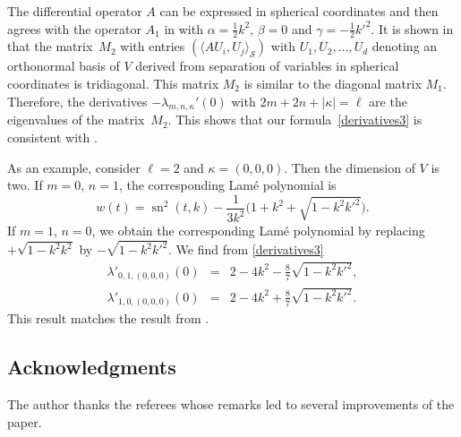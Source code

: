 \documentclass[pdftex]{sigma}
\newcommand{\Sp}{\mathcal{S}}
\DeclareMathOperator{\sn}{sn}
\numberwithin{equation}{section}
\begin{document}
The differential operator $A$ can be expressed in spherical coordinates and then agrees with
the operator $A_1$ in \cite{EK} with $\alpha=\frac12k^2$, $\beta=0$ and $\gamma=-\frac12k'^2$.
It is shown in \cite{EK} that the matrix~$M_2$ with entries $(\langle AU_i,U_j\rangle_\Sp)$ with $U_1,U_2,\dots,U_d$
denoting an orthonormal basis of $V$
derived from separation of variables in spherical coordinates is tridiagonal. This matrix $M_2$ is similar to
the diagonal matrix $M_1$. Therefore, the derivatives $-\lambda_{m,n,\kappa}'(0)$ with $2m+2n+|\kappa|=\ell$
are the eigenvalues of the matrix~$M_2$.
This shows that our formula~\eqref{derivatives3} is consistent with
\mbox{\cite[Theorem~4]{EK}}.

As an example, consider $\ell=2$ and $\kappa=(0,0,0)$.
Then the dimension of $V$ is two.
If $m=0$, $n=1$, the corresponding Lam\'e polynomial is \cite[p.~205]{A}
\[ w(t)=\sn^2(t,k)-\frac{1}{3k^2}\bigl(1+k^2+\sqrt{1-k^2k'^2}\bigr). \]
If $m=1$, $n=0$, we obtain the corresponding Lam\'e polynomial by replacing $+\sqrt{1-k^2k^2}$ by $-\sqrt{1-k^2k'^2}$.
We find from \eqref{derivatives3}
\begin{eqnarray*}
\lambda'_{0,1,(0,0,0)}(0)&=&2-4k^2-\tfrac87\sqrt{1-k^2k'^2},\\
\lambda'_{1,0,(0,0,0)}(0)&=&2-4k^2+\tfrac87\sqrt{1-k^2k'^2}.
\end{eqnarray*}
This result matches the result from \cite{EK}.

\subsection*{Acknowledgments}

The author thanks the referees whose remarks led to several improvements of the paper.
\end{document}
